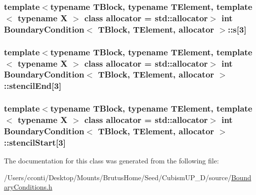 \subsubsection[{s}]{\setlength{\rightskip}{0pt plus 5cm}template$<$typename T\+Block, typename T\+Element, template$<$ typename X $>$ class allocator = std\+::allocator$>$ int {\bf Boundary\+Condition}$<$ T\+Block, T\+Element, allocator $>$\+::s\mbox{[}3\mbox{]}\hspace{0.3cm}{\ttfamily [protected]}}\label{class_boundary_condition_a7734cfc6ee1ce3a1dea426ab289a299a}
\hypertarget{class_boundary_condition_af396b479ba0487ba5c0e45d5b636f09e}{}
\subsubsection[{stencil\+End}]{\setlength{\rightskip}{0pt plus 5cm}template$<$typename T\+Block, typename T\+Element, template$<$ typename X $>$ class allocator = std\+::allocator$>$ int {\bf Boundary\+Condition}$<$ T\+Block, T\+Element, allocator $>$\+::stencil\+End\mbox{[}3\mbox{]}\hspace{0.3cm}{\ttfamily [protected]}}\label{class_boundary_condition_af396b479ba0487ba5c0e45d5b636f09e}
\hypertarget{class_boundary_condition_aed1e3cfd20d69c6084d901c246698fdd}{}
\subsubsection[{stencil\+Start}]{\setlength{\rightskip}{0pt plus 5cm}template$<$typename T\+Block, typename T\+Element, template$<$ typename X $>$ class allocator = std\+::allocator$>$ int {\bf Boundary\+Condition}$<$ T\+Block, T\+Element, allocator $>$\+::stencil\+Start\mbox{[}3\mbox{]}\hspace{0.3cm}{\ttfamily [protected]}}\label{class_boundary_condition_aed1e3cfd20d69c6084d901c246698fdd}


The documentation for this class was generated from the following file\+:\begin{DoxyCompactItemize}
\item 
/\+Users/cconti/\+Desktop/\+Mounts/\+Brutus\+Home/\+Seed/\+Cubism\+U\+P\+\_\+D/source/\hyperlink{_boundary_conditions_8h}{Boundary\+Conditions.\+h}\end{DoxyCompactItemize}
